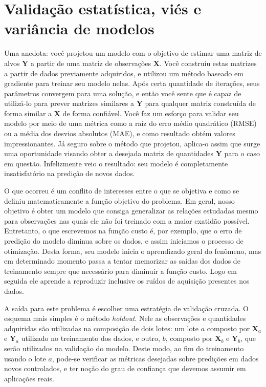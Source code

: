     \section{Validação estatística, viés e variância de modelos} \label{s:validacao}

      Uma anedota: você projetou um modelo com o objetivo de estimar uma matriz de alvos $\boldsymbol{Y}$ a partir de uma matriz de observações $\boldsymbol{X}$. Você construiu estas matrizes a partir de dados previamente adquiridos, e utilizou um método baseado em gradiente para treinar seu modelo nelas. Após certa quantidade de iterações, seus parâmetros convergem para uma solução, e então você sente que é capaz de utilizá-lo para prever matrizes similares a $\boldsymbol{Y}$ para qualquer matriz construída de forma similar a $\boldsymbol{X}$ de forma confiável. Você faz um esforço para validar seu modelo por meio de uma métrica como a raíz do erro médio quadrático (RMSE) ou a média dos desvios absolutos (MAE), e como resultado obtém valores impressionantes. Já seguro sobre o método que projetou, aplica-o assim que surge uma oportunidade visando obter a desejada matriz de quantidades $\boldsymbol{Y}$ para o caso em questão. Infelizmente veio o resultado: seu modelo é completamente insatisfatório na predição de novos dados.

      O que ocorreu é um conflito de interesses entre o que se objetiva e como se definiu matematicamente a função objetivo do problema. Em geral, nosso objetivo é obter um modelo que consiga generalizar as relações estudadas mesmo para observações nas quais ele não foi treinado com a maior exatidão possível. Entretanto, o que escrevemos na função custo é, por exemplo, que o erro de predição do modelo diminua sobre os dados, e assim iniciamos o processo de otimização. Desta forma, seu modelo inicia o aprendizado geral do fenômeno, mas em determinado momento passa a tentar memorizar as saídas dos dados de treinamento sempre que necessário para diminuir a função custo. Logo em seguida ele aprende a reproduzir inclusive os ruídos de aquisição presentes nos dados.

      A saída para este problema é escolher uma estratégia de validação cruzada. O esquema mais simples é o método \textit{holdout}. Nele as observações e quantidades adquiridas são utilizadas na composição de dois lotes: um lote $a$ composto por $\boldsymbol{X}_a$ e $\boldsymbol{Y}_a$ utilizado no treinamento dos dados, e outro, $b$, composto por $\boldsymbol{X}_b$ e $\boldsymbol{Y}_b$, que serão utilizados na validação do modelo. Deste modo, ao fim do treinamento usando o lote $a$, pode-se verificar as métricas desejadas sobre predições em dados novos controlados, e ter noção do grau de confiança que devemos assumir em aplicações reais.

